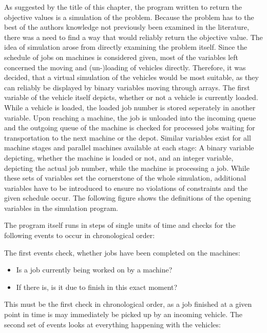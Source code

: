 As suggested by the title of this chapter, the program written to return the objective values is a simulation of the problem. Because the problem
has to the best of the authors knowledge not previously been examined in the literature, there was a need to find a way that would reliably return
the objective value. The idea of simulation arose from directly examining the problem itself. Since the schedule of jobs on machines is considered
given, most of the variables left concerned the moving and (un-)loading of vehicles directly. Therefore, it was decided, that a virtual simulation of
the vehicles would be most suitable, as they can reliably be displayed by binary variables moving through arrays. The first variable of the vehicle
itself depicts, whether or not a vehicle is currently loaded. While a vehicle is loaded, the loaded job number is stored seperately in another
variable. Upon reaching a machine, the job is unloaded into the incoming queue and the outgoing queue of the machine is checked for processed jobs
waiting for transportation to the next machine or the depot. Similar variables exist for all machine stages and parallel machines available at each
stage: A binary variable depicting, whether the machine is loaded or not, and an integer variable, depicting the actual job number, while the machine
is processing a job. While these sets of variables set the cornerstone of the whole simulation, additional variables have to be introduced to ensure
no violations of constraints and the given schedule occur. The following figure shows the definitions of the opening variables in the simulation program.

The program itself runs in steps of single units of time and checks for the following events to occur in chronological order:

The first events check, whether jobs have been completed on the machines:

\begin{itemize}
\item Is a job currently being worked on by a machine?

\item If there is, is it due to finish in this exact moment?
\end{itemize}

This must be the first check in chronological order, as a job finished at a given point in time is may immediately be picked up by an
incoming vehicle. The second set of events looks at everything happening with the vehicles:

